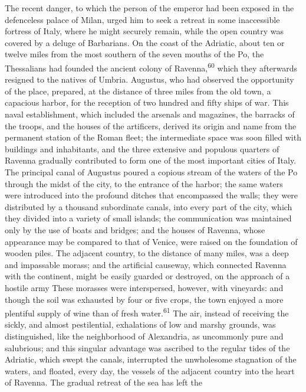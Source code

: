 The recent danger, to which the person of the emperor had been
exposed in the defenceless palace of Milan, urged him to seek a
retreat in some inaccessible fortress of Italy, where he might
securely remain, while the open country was covered by a deluge
of Barbarians. On the coast of the Adriatic, about ten or twelve
miles from the most southern of the seven mouths of the Po, the
Thessalians had founded the ancient colony of Ravenna,\textsuperscript{60} which
they afterwards resigned to the natives of Umbria. Augustus, who
had observed the opportunity of the place, prepared, at the
distance of three miles from the old town, a capacious harbor,
for the reception of two hundred and fifty ships of war. This
naval establishment, which included the arsenals and magazines,
the barracks of the troops, and the houses of the artificers,
derived its origin and name from the permanent station of the
Roman fleet; the intermediate space was soon filled with
buildings and inhabitants, and the three extensive and populous
quarters of Ravenna gradually contributed to form one of the most
important cities of Italy. The principal canal of Augustus poured
a copious stream of the waters of the Po through the midst of the
city, to the entrance of the harbor; the same waters were
introduced into the profound ditches that encompassed the walls;
they were distributed by a thousand subordinate canals, into
every part of the city, which they divided into a variety of
small islands; the communication was maintained only by the use
of boats and bridges; and the houses of Ravenna, whose appearance
may be compared to that of Venice, were raised on the foundation
of wooden piles. The adjacent country, to the distance of many
miles, was a deep and impassable morass; and the artificial
causeway, which connected Ravenna with the continent, might be
easily guarded or destroyed, on the approach of a hostile army
These morasses were interspersed, however, with vineyards: and
though the soil was exhausted by four or five crops, the town
enjoyed a more plentiful supply of wine than of fresh water.\textsuperscript{61}
The air, instead of receiving the sickly, and almost
pestilential, exhalations of low and marshy grounds, was
distinguished, like the neighborhood of Alexandria, as uncommonly
pure and salubrious; and this singular advantage was ascribed to
the regular tides of the Adriatic, which swept the canals,
interrupted the unwholesome stagnation of the waters, and
floated, every day, the vessels of the adjacent country into the
heart of Ravenna. The gradual retreat of the sea has left the
